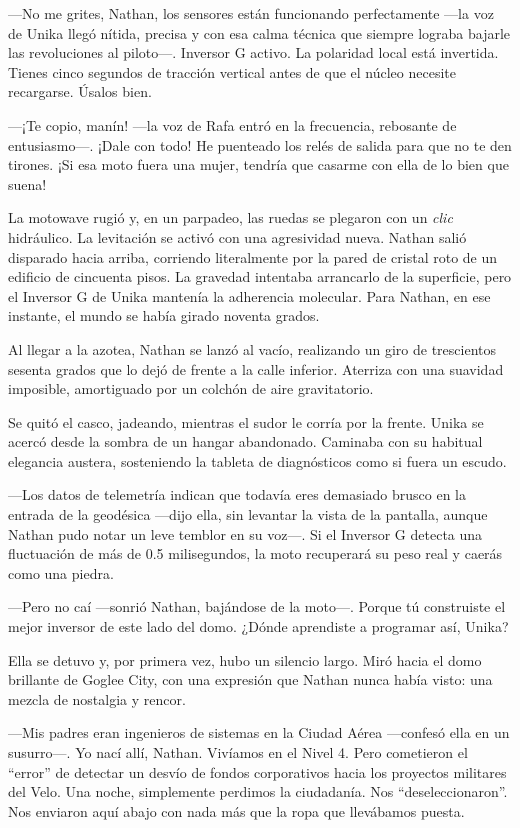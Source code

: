 \documentclass[12pt,a4paper]{book}
\begin{document}
---No me grites, Nathan, los sensores están funcionando perfectamente ---la voz de Unika llegó nítida, precisa y con esa calma técnica que siempre lograba bajarle las revoluciones al piloto---. Inversor G activo. La polaridad local está invertida. Tienes cinco segundos de tracción vertical antes de que el núcleo necesite recargarse. Úsalos bien.

---¡Te copio, manín! ---la voz de Rafa entró en la frecuencia, rebosante de entusiasmo---. ¡Dale con todo! He puenteado los relés de salida para que no te den tirones. ¡Si esa moto fuera una mujer, tendría que casarme con ella de lo bien que suena!

La motowave rugió y, en un parpadeo, las ruedas se plegaron con un \textit{clic} hidráulico. La levitación se activó con una agresividad nueva. Nathan salió disparado hacia arriba, corriendo literalmente por la pared de cristal roto de un edificio de cincuenta pisos. La gravedad intentaba arrancarlo de la superficie, pero el Inversor G de Unika mantenía la adherencia molecular. Para Nathan, en ese instante, el mundo se había girado noventa grados.

Al llegar a la azotea, Nathan se lanzó al vacío, realizando un giro de trescientos sesenta grados que lo dejó de frente a la calle inferior. Aterriza con una suavidad imposible, amortiguado por un colchón de aire gravitatorio.

Se quitó el casco, jadeando, mientras el sudor le corría por la frente. Unika se acercó desde la sombra de un hangar abandonado. Caminaba con su habitual elegancia austera, sosteniendo la tableta de diagnósticos como si fuera un escudo.

---Los datos de telemetría indican que todavía eres demasiado brusco en la entrada de la geodésica ---dijo ella, sin levantar la vista de la pantalla, aunque Nathan pudo notar un leve temblor en su voz---. Si el Inversor G detecta una fluctuación de más de 0.5 milisegundos, la moto recuperará su peso real y caerás como una piedra.

---Pero no caí ---sonrió Nathan, bajándose de la moto---. Porque tú construiste el mejor inversor de este lado del domo. ¿Dónde aprendiste a programar así, Unika?

Ella se detuvo y, por primera vez, hubo un silencio largo. Miró hacia el domo brillante de Goglee City, con una expresión que Nathan nunca había visto: una mezcla de nostalgia y rencor.

---Mis padres eran ingenieros de sistemas en la Ciudad Aérea ---confesó ella en un susurro---. Yo nací allí, Nathan. Vivíamos en el Nivel 4. Pero cometieron el ``error'' de detectar un desvío de fondos corporativos hacia los proyectos militares del Velo. Una noche, simplemente perdimos la ciudadanía. Nos ``deseleccionaron''. Nos enviaron aquí abajo con nada más que la ropa que llevábamos puesta.
\end{document}
